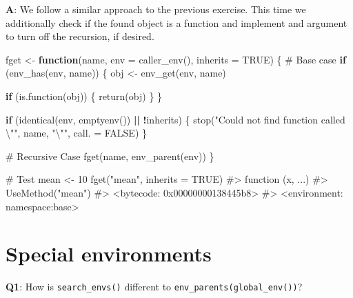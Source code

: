 \documentclass[
]{krantz}
\makeatletter
\newenvironment{Shaded}{\begin{snugshade}}{\end{snugshade}}
\newcommand{\CharTok}[1]{\textcolor[rgb]{0.31,0.60,0.02}{#1}}
\newcommand{\CommentTok}[1]{\textcolor[rgb]{0.56,0.35,0.01}{\textit{#1}}}
\newcommand{\ControlFlowTok}[1]{\textcolor[rgb]{0.13,0.29,0.53}{\textbf{#1}}}
\newcommand{\DataTypeTok}[1]{\textcolor[rgb]{0.13,0.29,0.53}{#1}}
\newcommand{\DecValTok}[1]{\textcolor[rgb]{0.00,0.00,0.81}{#1}}
\newcommand{\KeywordTok}[1]{\textcolor[rgb]{0.13,0.29,0.53}{\textbf{#1}}}
\newcommand{\NormalTok}[1]{#1}
\newcommand{\OperatorTok}[1]{\textcolor[rgb]{0.81,0.36,0.00}{\textbf{#1}}}
\newcommand{\OtherTok}[1]{\textcolor[rgb]{0.56,0.35,0.01}{#1}}
\newcommand{\StringTok}[1]{\textcolor[rgb]{0.31,0.60,0.02}{#1}}
\newenvironment{kframe}{%
\medskip{}
\setlength{\fboxsep}{.8em}
 \def\at@end@of@kframe{}%
 \ifinner\ifhmode%
  \def\at@end@of@kframe{\end{minipage}}%
  \begin{minipage}{\columnwidth}%
 \fi\fi%
 \def\FrameCommand##1{\hskip\@totalleftmargin \hskip-\fboxsep
 \colorbox{shadecolor}{##1}\hskip-\fboxsep
     \hskip-\linewidth \hskip-\@totalleftmargin \hskip\columnwidth}%
 \MakeFramed {\advance\hsize-\width
   \@totalleftmargin\z@ \linewidth\hsize
   \@setminipage}}%
 {\par\unskip\endMakeFramed%
 \at@end@of@kframe}
\renewenvironment{Shaded}{\begin{kframe}}{\end{kframe}}
\renewcommand{\KeywordTok} [1]{\textcolor[rgb]{0.00,0.44,0.13}{{#1}}}
\renewcommand{\DataTypeTok}[1]{\textcolor[rgb]{0.56,0.13,0.00}{{#1}}}
\renewcommand{\DecValTok}  [1]{\textcolor[rgb]{0.25,0.63,0.44}{{#1}}}
\renewcommand{\CharTok}    [1]{\textcolor[rgb]{0.25,0.44,0.63}{{#1}}}
\renewcommand{\StringTok}  [1]{\textcolor[rgb]{0.25,0.44,0.63}{{#1}}}
\renewcommand{\CommentTok} [1]{\textcolor[rgb]{0.38,0.63,0.69}{{#1}}}
\renewcommand{\OtherTok}   [1]{\textcolor[rgb]{0.00,0.44,0.13}{{#1}}}
\renewcommand{\NormalTok}  [1]{{#1}}
\makeatother
\begin{document}
\textbf{{A}}: We follow a similar approach to the previous exercise. This time we additionally check if the found object is a function and implement and argument to turn off the recursion, if desired.

\begin{Shaded}
\begin{Highlighting}[]
\NormalTok{fget <-}\StringTok{ }\ControlFlowTok{function}\NormalTok{(name, }\DataTypeTok{env =} \KeywordTok{caller_env}\NormalTok{(), }\DataTypeTok{inherits =} \OtherTok{TRUE}\NormalTok{) \{}
  \CommentTok{# Base case}
  \ControlFlowTok{if}\NormalTok{ (}\KeywordTok{env_has}\NormalTok{(env, name)) \{}
\NormalTok{    obj <-}\StringTok{ }\KeywordTok{env_get}\NormalTok{(env, name)}
    
    \ControlFlowTok{if}\NormalTok{ (}\KeywordTok{is.function}\NormalTok{(obj)) \{}
      \KeywordTok{return}\NormalTok{(obj)}
\NormalTok{    \}}
\NormalTok{  \}}
  
  \ControlFlowTok{if}\NormalTok{ (}\KeywordTok{identical}\NormalTok{(env, }\KeywordTok{emptyenv}\NormalTok{()) }\OperatorTok{||}\StringTok{ }\OperatorTok{!}\NormalTok{inherits) \{}
    \KeywordTok{stop}\NormalTok{(}\StringTok{"Could not find function called }\CharTok{\textbackslash{}"}\StringTok{"}\NormalTok{, name, }\StringTok{"}\CharTok{\textbackslash{}"}\StringTok{"}\NormalTok{,}
         \DataTypeTok{call. =} \OtherTok{FALSE}\NormalTok{)}
\NormalTok{  \}}
  
  \CommentTok{# Recursive Case}
  \KeywordTok{fget}\NormalTok{(name, }\KeywordTok{env_parent}\NormalTok{(env))}
\NormalTok{\}}

\CommentTok{# Test}
\NormalTok{mean <-}\StringTok{ }\DecValTok{10}
\KeywordTok{fget}\NormalTok{(}\StringTok{"mean"}\NormalTok{, }\DataTypeTok{inherits =} \OtherTok{TRUE}\NormalTok{)}
\CommentTok{#> function (x, ...) }
\CommentTok{#> UseMethod("mean")}
\CommentTok{#> <bytecode: 0x00000000138445b8>}
\CommentTok{#> <environment: namespace:base>}
\end{Highlighting}
\end{Shaded}

\hypertarget{special-environments}{%
\section{Special environments}\label{special-environments}}

\textbf{{Q1}}: How is \texttt{search\_envs()} different to \texttt{env\_parents(global\_env())}?
\end{document}
